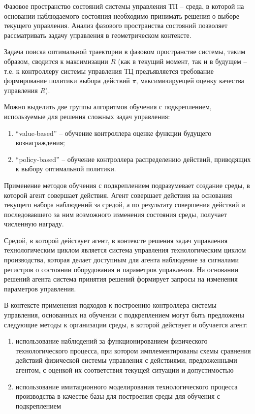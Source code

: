 Фазовое пространство состояний системы управления ТП – среда, в которой на основании наблюдаемого состояния необходимо принимать решения о выборе текущего управления. Анализ фазового пространства состояний позволяет рассматривать задачу управления в геометрическом контексте. 

Задача поиска оптимальной траектории в фазовом пространстве системы, таким образом, сводится к максимизации $R$ (как в текущий момент, так и в будущем – т.е. к контроллеру системы управления ТЦ предъявляется требование формирование политики выбора действий $\pi$, максимизируещей оценку качества управления $R$).

Можно выделить две группы алгоритмов обучения с подкреплением, используемые для решения сложных задач управления:

\begin{enumerate}
    \item ``value-based'' – обучение контроллера оценке функции будущего вознаграждения;
    \item ``policy-based'' – обучение контроллера распределению действий, приводящих к выбору оптимальной политики.
\end{enumerate}


Применение методов обучения с подкреплением подразумевает создание среды, в которой агент совершает действия. Агент совершает действия на основания текущего набора наблюдений за средой, а по результату совершения действий и последовавшего за ним возможного изменения состояния среды, получает численную награду.


Средой, в которой действует агент, в контексте решения задач управления технологическим циклом является система управления технологическим циклом производства, которая делает доступным для агента наблюдение за сигналами регистров о состоянии оборудования и параметров управления. На основании решений агента система принятия решений формирует запросы на изменения параметров управления.


В контексте применения подходов к построению контроллера системы управления, основанных на обучении с подкреплением могут быть предложены следующие методы к организации среды, в которой действует и обучается агент:

\begin{enumerate}
    \item использование наблюдений за функционированием физического технологического процесса, при котором имплементированы схемы сравнения действий физической системы управления с действиями, предложенными агентом, с оценкой их соответствия текущей ситуации и допустимостью
    \item использование имитационного моделирования технологического процесса производства в качестве базы для построения среды для обучения с подкреплением
\end{enumerate}

